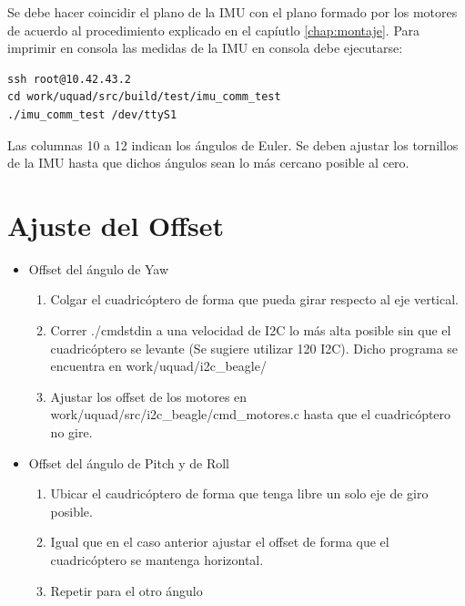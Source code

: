 \documentclass[main]{subfiles}
\begin{document}
Se debe hacer coincidir el plano de la IMU con el plano formado por los motores de acuerdo al procedimiento explicado en el cap\'iutlo \ref{chap:montaje}. Para imprimir en consola las medidas de la IMU en consola debe ejecutarse:
\begin{verbatim}
ssh root@10.42.43.2
cd work/uquad/src/build/test/imu_comm_test
./imu_comm_test /dev/ttyS1
\end{verbatim}

Las columnas 10 a 12 indican los \'angulos de Euler. Se deben ajustar los tornillos de la IMU hasta que dichos \'angulos sean lo m\'as cercano posible al cero.

\section{Ajuste del Offset}
\begin{itemize}
\item Offset del \'angulo de Yaw
	\begin{enumerate}
	\item Colgar el cuadric\'optero de forma que pueda girar respecto al eje vertical. 
	\item Correr ./cmdstdin a una velocidad de I2C lo m\'as alta posible sin que el cuadric\'optero se levante (Se sugiere utilizar 120 I2C). Dicho programa se encuentra en work/uquad/i2c\_beagle/ 
	\item Ajustar los offset de los motores en work/uquad/src/i2c\_beagle/cmd\_motores.c hasta que el cuadric\'optero no gire.
	\end{enumerate}
\item Offset del \'angulo de Pitch y de Roll
	\begin{enumerate}
	\item Ubicar el caudric\'optero de forma que tenga libre un solo eje de giro posible.
	\item Igual que en el caso anterior ajustar el offset de forma que el cuadric\'optero se mantenga horizontal.
	\item Repetir para el otro \'angulo
	\end{enumerate}	
\end{itemize}
\end{document}
